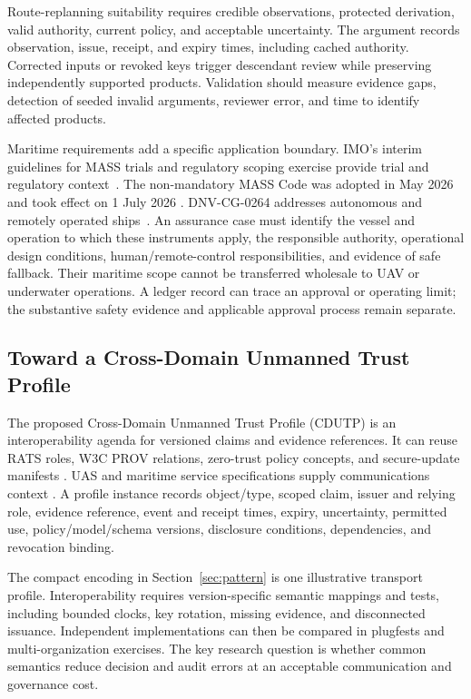 \documentclass[blockchains,review,accept,moreauthors]{Definitions/mdpi}
\newcommand{\CDUTP}{Cross-Domain Unmanned Trust Profile (CDUTP)}
\begin{document}
Route-replanning suitability requires credible observations, protected derivation, valid authority, current policy, and acceptable uncertainty. The argument records observation, issue, receipt, and expiry times, including cached authority. Corrected inputs or revoked keys trigger descendant review while preserving independently supported products. Validation should measure evidence gaps, detection of seeded invalid arguments, reviewer error, and time to identify affected products.

Maritime requirements add a specific application boundary. IMO's interim guidelines for MASS trials and regulatory scoping exercise provide trial and regulatory \mbox{context \citep{imo2019trials,imo2021scoping}}. The non-mandatory MASS Code was adopted in May 2026 and took effect on 1 July 2026 \citep{imo2026mass}. DNV-CG-0264 addresses autonomous and remotely operated ships~\citep{dnv2024autonomous}. An assurance case must identify the vessel and operation to which these instruments apply, the responsible authority, operational design conditions, human/remote-control responsibilities, and evidence of safe fallback. Their maritime scope cannot be transferred wholesale to UAV or underwater operations. A ledger record can trace an approval or operating limit; the substantive safety evidence and applicable approval process remain separate.

\subsection{Toward a Cross-Domain Unmanned Trust Profile}

The proposed \CDUTP{} is an interoperability agenda for versioned claims and evidence references. It can reuse RATS roles, W3C PROV relations, zero-trust policy concepts, and secure-update manifests \citep{birkholz2023remote,w3c2013provo,rose2020zero,ietf2020suit}. UAS and maritime service specifications supply communications context \citep{threegpp22125,threegpp22119}. A profile instance records object/type, scoped claim, issuer and relying role, evidence reference, event and receipt times, expiry, uncertainty, permitted use, policy/model/schema versions, disclosure conditions, dependencies, and revocation binding.

The compact encoding in Section~\ref{sec:pattern} is one illustrative transport profile. Interoperability requires version-specific semantic mappings and tests, including bounded clocks, key rotation, missing evidence, and disconnected issuance. Independent implementations can then be compared in plugfests and multi-organization exercises. The key research question is whether common semantics reduce decision and audit errors at an acceptable communication and governance cost.
\end{document}
